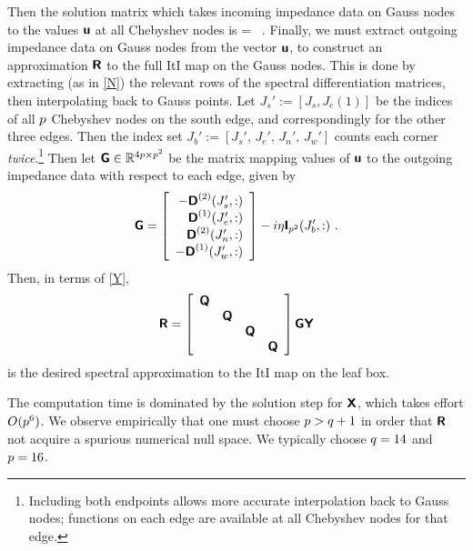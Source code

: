 \documentclass[11pt,final]{amsart}
\theoremstyle{definition}
\numberwithin{remark}{section}
\numberwithin{definition}{section}
\numberwithin{pro}{section}
\begin{document}
Then the solution matrix which takes incoming impedance data on Gauss nodes to
the values $\bm{\mathsf{u}}$ at all Chebyshev nodes is
\be
{} = 
~.
\label{Y}
\ee
Finally, we must extract outgoing impedance data on Gauss nodes
from the vector $\bm{\mathsf{u}}$,
to construct an approximation $\bm{\mathsf{R}}$ to the full ItI map on the Gauss nodes.
This is done by extracting (as in \eqref{N}) the relevant rows of the spectral differentiation matrices,
then interpolating back to Gauss points.
Let $J_s' := [J_s,J_e(1)]$ be the indices of all $p$ Chebyshev nodes on the
south edge, and correspondingly for the other three edges.
Then the index set $J_b' := [J_s',\,J_e',\,J_n',\,J_w']$
counts each corner {\em twice}.\footnote{Including both endpoints allows more accurate
interpolation back to Gauss nodes;
functions on each edge are available at all Chebyshev nodes for that edge.}
Then let $\bm{\mathsf{G}}\in \mathbb{R}^{4p\times p^2}$ be the matrix mapping values of $\bm{\mathsf{u}}$ to the outgoing
impedance data with respect to each edge, given by
$$
\bm{\mathsf{G}} =  \left[\begin{array}{r}-{\bm{\mathsf{D}}^{(2)}}(J_s',:)\\{\bm{\mathsf{D}}^{(1)}}(J_e',:)\\{\bm{\mathsf{D}}^{(2)}}(J_n',:)\\-{\bm{\mathsf{D}}^{(1)}}(J_w',:)\end{array}\right]
- i\eta \bm{\mathsf{I}}_{p^2}(J_b',:)
~.
$$
Then, in terms of \eqref{Y},
$$
\bm{\mathsf{R}} =
\left[\begin{array}{llll}\bm{\mathsf{Q}}& & &\\&\bm{\mathsf{Q}}&&\\&&\bm{\mathsf{Q}}&\\&&&\bm{\mathsf{Q}}\end{array}\right]
\bm{\mathsf{G}} \bm{\mathsf{Y}}
$$
is the desired spectral approximation to the ItI map on the leaf box.

The computation time is dominated by the solution step for $\bm{\mathsf{X}}$, which takes
effort $O(p^6)$.
We observe empirically that one must choose $p > q+1$ in order that $\bm{\mathsf{R}}$ not acquire a spurious
numerical null space. We typically choose $q = 14$ and $p = 16$.
\end{document}

